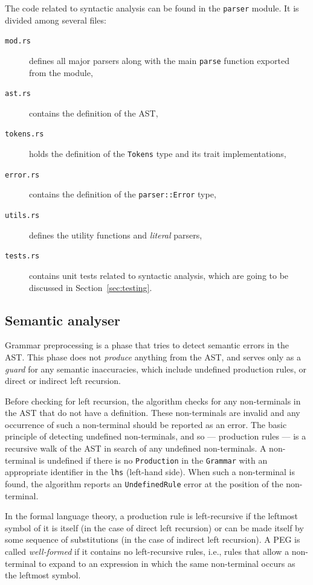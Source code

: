\documentclass[english,bachelors,forcepolishlogotype]{wizthesis}
\newcommand{\paraphrase}[1]{#1}
\begin{document}
The code related to syntactic analysis can be found in the \texttt{parser}
module. It is divided among several files:
\begin{description}
  \item[\texttt{mod.rs}] defines all major parsers along with the main
  \texttt{parse} function exported from the module,
  \item[\texttt{ast.rs}] contains the definition of the AST,
  \item[\texttt{tokens.rs}] holds the definition of the \texttt{Tokens}
  type and its trait implementations,
  \item[\texttt{error.rs}] contains the definition of the \texttt{parser::Error}
  type,
  \item[\texttt{utils.rs}] defines the utility functions and \emph{literal}
  parsers,
  \item[\texttt{tests.rs}] contains unit tests related to syntactic analysis,
  which are going to be discussed in Section~\ref{sec:testing}.
\end{description}

\newpage

\subsection{Semantic analyser} \label{sbs:semantic-analyser}

Grammar preprocessing is a phase that tries to detect semantic errors in the
AST. This phase does not \emph{produce} anything from the AST, and serves only
as a \emph{guard} for any semantic inaccuracies, which include undefined
production rules, or direct or indirect left recursion.

Before checking for left recursion, the algorithm checks for any non-terminals
in the AST that do not have a definition. These non-terminals are invalid and
any occurrence of such a non-terminal should be reported as an error. The basic
principle of detecting undefined non-terminals, and so --- production rules ---
is a recursive walk of the AST in search of any undefined non-terminals. A
non-terminal is undefined if there is no \texttt{Production} in the
\texttt{Grammar} with an appropriate identifier in the \texttt{lhs} (left-hand
side). When such a non-terminal is found, the algorithm reports an
\texttt{UndefinedRule} error at the position of the non-terminal.

\paraphrase{In the formal language theory, a production rule is left-recursive
if the leftmost symbol of it is itself (in the case of direct left recursion) or
can be made itself by some sequence of substitutions (in the case of indirect
left recursion). A PEG is called \emph{well-formed} if it contains no
left-recursive rules, i.e., rules that allow a non-terminal to expand to an
expression in which the same non-terminal occurs as the leftmost symbol.}
\end{document}
